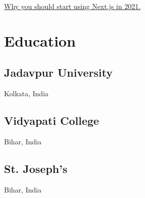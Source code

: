 \documentclass[]{deedy-resume-openfont}
\begin{document}
\begin{minipage}[t]{0.28\textwidth}
\href{https://blog.kishans.in/why-you-should-start-using-nextjs-in-2021}{\textbullet   Why you should start using Next.js in 2021.}

\sectionsep
\section{Education} 
\subsection{Jadavpur University}
Kolkata, India\\
\sectionsep

\subsection{Vidyapati College}
Bihar, India\\
\sectionsep

\subsection{St. Joseph's}
Bihar, India\\
\sectionsep

%
%

\end{minipage} 
\hfill
\end{document}
